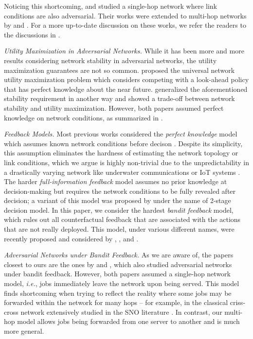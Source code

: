 \documentclass[11pt,fullpage,letterpaper]{article} %
\begin{document}
Noticing this shortcoming, \citet{andrews2004scheduling} and \citet{andrews2005scheduling} studied a single-hop network where link conditions are also adversarial. Their works were extended to multi-hop networks by \citet{andrews2007stability} and \citet{lim2013stability}.
For a more up-to-date discussion on these works, we refer the readers to the discussions in \citep{liang2018minimizing}.

\textit{Utility Maximization in Adversarial Networks.}
While it has been more and more results considering network stability in adversarial networks, the utility maximization guarantees are not so common.
\citet{neely2010universal} proposed the universal network utility maximization problem which considers competing with a look-ahead policy that has perfect knowledge about the near future.
\citet{liang2018network} generalized the aforementioned stability requirement in another way and showed a trade-off between network stability and utility maximization.
However, both papers assumed perfect knowledge on network conditions, as summarized in .

\textit{Feedback Models.}
Most previous works considered the \textit{perfect knowledge} model which assumes known network conditions before decison \citep{liang2018minimizing,liang2018network}. Despite its simplicity, this assumption eliminates the hardness of estimating the network topology or link conditions, which we argue is highly non-trivial due to the unpredictability in a drastically varying network like underwater communications \citep{khan2020channel} or IoT systems \citep{gaddam2020detecting}.
The harder \textit{full-information feedback} model assumes no prior knowledge at decision-making but requires the network conditions to be fully revealed after decision; a variant of this model was proposed by \citet{neely2012max} under the name of 2-stage decision model.
In this paper, we consider the hardest \textit{bandit feedback} model, which rules out all counterfactual feedback that are associated with the actions that are not really deployed. This model, under various different names, were recently proposed and considered by \citet{fu2022joint}, \citet{yang2023learning}, and \citet{huang2023queue}.

\textit{Adversarial Networks under Bandit Feedback.}
As we are aware of, the papers closest to ours are the ones by \citet{huang2023queue} and
\citet{yang2023learning}, which also studied adversarial networks under bandit feedback.
However, both papers assumed a single-hop network model, \textit{i.e.}, jobs immediately leave the network upon being served. This model finds shortcoming when trying to reflect the reality where some jobs may be forwarded within the network for many hops -- for example, in the classical criss-cross network extensively studied in the SNO literature \citep{harrison1990scheduling}. In contrast, our multi-hop model allows jobs being forwarded from one server to another and is much more general.
\end{document}
